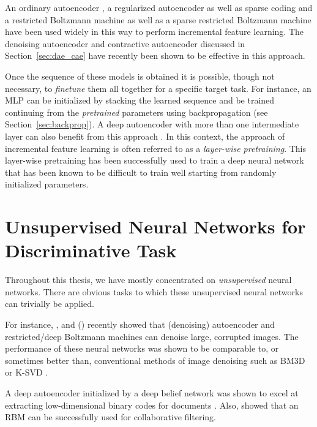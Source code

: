 \documentclass[dissertation,nocontribution,draft*]{aaltoseries}
\begin{document}
An ordinary autoencoder \citep[see, e.g.,][and
Section~\ref{sec:autoencoders}]{Bengio2007nips}, a
regularized autoencoder \citep[see, e.g.,][and
Section~\ref{sec:spaenc}]{Ranzato2008} as
well as sparse coding \citep[see, e.g.,][and
Section~\ref{sec:sparse_coding}]{Raina2007} and a restricted
Boltzmann machine \citep[see, e.g.,][and
Section~\ref{sec:rbm}]{Hinton2006} as well as a sparse
restricted Boltzmann machine \citep[see, e.g.,][]{Lee2007}
have been used widely in this way to perform incremental
feature learning. The denoising autoencoder
\citep{Vincent2010} and contractive autoencoder
\citep{Rifai2011} discussed in Section~\ref{sec:dae_cae}
have recently been shown to be effective in this approach.

Once the sequence of these models is obtained it is
possible, though not necessary, to \textit{finetune} them
all together for a specific target task. For instance, an
MLP can be initialized by stacking the learned sequence and
be trained continuing from the \textit{pretrained}
parameters using backpropagation (see
Section~\ref{sec:backprop}). A deep autoencoder with more
than one intermediate layer can also benefit from this
approach \citep{Hinton2006}. In this context, the approach
of incremental feature learning is often referred to as a
\textit{layer-wise pretraining}. This layer-wise pretraining
has been successfully used to train a deep neural network
that has been known to be difficult to train well
starting from randomly initialized parameters.

\section{Unsupervised Neural Networks for Discriminative
Task}
\label{sec:dunn}

Throughout this thesis, we have mostly concentrated on
\textit{unsupervised} neural networks.  There are obvious
tasks to which these unsupervised neural networks can
trivially be applied.

For instance, \citet{Burger2012}, \citet{Xie2012} and
\citet{Cho2013} () 
recently showed
that (denoising) autoencoder and restricted/deep Boltzmann
machines can denoise large, corrupted images.  The
performance of these neural networks was shown to be
comparable to, or sometimes better than, conventional
methods of image denoising such as BM3D \citep{Dabov2007} or
K-SVD \citep{Portilla2003}.  

A deep autoencoder initialized by a deep belief network
was shown to excel at extracting low-dimensional binary
codes for documents \citep{Salakhutdinov2009s}.  Also,
\citet{Salakhutdinov2007} showed that an RBM can be
successfully used for collaborative filtering. 
\end{document}
